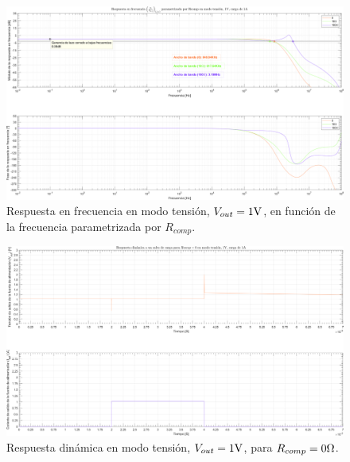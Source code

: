 \clearpage

\begin{figure}[H] %
\begin{center}
\includegraphics[width=1.1 \textwidth, angle=90]{./img/plots/rf/power_supply_RCOMP_RF_Modo2.png}
\caption{\label{fig:fig_power_supply_RCOMP_RF_Modo2}\footnotesize{Respuesta en frecuencia en modo tensión, $V_{out} = 1 \si[per-mode=symbol]{\volt}$, en función de la frecuencia parametrizada por $R_{comp}$.}}
\end{center}
\end{figure}

\clearpage

\begin{figure}[H] %
\begin{center}
\includegraphics[width=1.1 \textwidth, angle=90]{./img/plots/dynamic/power_supply_RCOMP_0_STEP_Modo2.png}
\caption{\label{fig:fig_power_supply_RCOMP_STEP_0_Modo2}\footnotesize{Respuesta dinámica en modo tensión, $V_{out} = 1 \si[per-mode=symbol]{\volt}$, para $R_{comp} = 0 \si[per-mode=symbol]{\ohm} $.}}
\end{center}
\end{figure}

